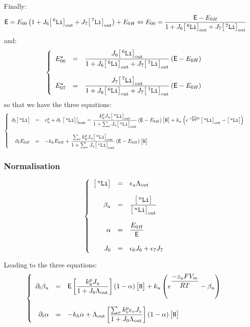 \documentclass[aps,onecolumn,11pt]{revtex4}
\newcommand{\mychem}[1]{\mathtt{#1}}
\newcommand{\myconc}[1]{\big[#1\big]}
\newcommand{\Faraday}{\mathrm{F}}
\newcommand{\spLi}[1]{{\!~^{#1}\mychem{Li}}}
\newcommand{\Li}[1]{\myconc{\spLi{#1}}}
\newcommand{\spproton}{\mychem{H}}
\newcommand{\proton}{\myconc{\spproton}}
\newcommand{\myleak}[1]{\left.{#1}\right\vert_{\mathrm{leak}}}
\newcommand{\myout}[1]{{#1}_{\tiny\mathrm{out}}}
\newcommand{\LiOut}[1]{\myout{\Li{#1}}}
\newcommand{\LiAll}{\Lambda}
\newcommand{\LiAllOut}{\myout{\LiAll}}
\begin{document}
Finally:
\begin{equation}
\mathsf{E} = E_{00}\left(1+J_6\LiOut{6}+J_7\LiOut{7}\right) + E_{0H} \Leftrightarrow E_{00} = \dfrac{\mathsf{E}-E_{0H}}{1+J_6\LiOut{6}+J_7\LiOut{7}}
\end{equation}
and:
\begin{equation}
\left\lbrace
\begin{array}{rcl}
	E_{06}^\star & = & \dfrac{J_6\LiOut{6}}{1+J_6\LiOut{6}+J_7\LiOut{7}} \left(\mathsf{E}-E_{0H}\right)\\
	\\
	E_{07}^\star & = & \dfrac{J_7\LiOut{7}}{1+J_6\LiOut{6}+J_7\LiOut{7}} \left(\mathsf{E}-E_{0H}\right)\\
\end{array}
\right.
\end{equation}
so that we have the three equations:
\begin{equation}
\left\lbrace
\begin{array}{rcl}
	\partial_t \Li{u}  & = & v^p_u +\partial_t \myleak{\Li{u}}  = \dfrac{k^p_u J_u \LiOut{u}}{1+\sum_v J_v \LiOut{v}} \left(\mathsf{E}-E_{0H}\right) \proton + k_u \left( e^{\frac{-\Faraday V_m }{RT}} \LiOut{u} - \Li{u}\right) \\
	\\
	\partial_t E_{0H} & = & -k_h E_{0H} + \dfrac{\sum_v k^p_u J_u \LiOut{u}}{1+\sum_v J_v \LiOut{v}} \left(\mathsf{E}-E_{0H}\right) \proton \\
\end{array}
\right.
\end{equation}
\subsubsection{Normalisation}
\begin{equation}
\left\lbrace
\begin{array}{rcl}
	\Li{u} & = & \epsilon_u \LiAllOut\\
	\\
	\beta_u & = & \dfrac{\Li{u}}{\LiOut{u}}\\
	\\
	\alpha  & = & \dfrac{E_{0H}}{\mathsf{E}}\\
	\\
	J_0 & = & \epsilon_6 J_6  + \epsilon_7 J_7 \\
\end{array}
\right.
\end{equation}

Leading to the three equations:
\begin{equation}
\left\lbrace
\begin{array}{rcl}
	\partial_t \beta_u & = & \mathsf{E} \left[\dfrac{k^p_u J_u}{1+J_0 \LiAllOut}\right] \left(1-\alpha\right) \proton
	 + k_u \left( e^{\dfrac{-z_u F V_m }{RT}}- \beta_u\right)\\
	\\
	\partial_t \alpha  & = &  -k_h\alpha + \LiAllOut \left[\dfrac{ \sum_v k^p_v \epsilon_v J_v}{1+J_0\LiAllOut}\right] \left(1-\alpha\right) \proton\\
\end{array}
\right.
\end{equation}
\end{document}
